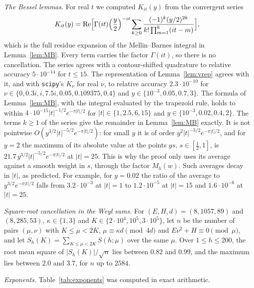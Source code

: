 \documentclass[11pt]{amsart}
\theoremstyle{remark}
\theoremstyle{definition}
\numberwithin{equation}{section}
\begin{document}
\emph{The Bessel lemmas.} For real $t$ we computed $K_{it}(y)$ from the convergent series
\[
K_{it}(y)=\operatorname{Re}\Bigl[\Gamma(it)\Bigl(\frac y2\Bigr)^{-it}\sum_{k\ge0}\frac{(-1)^k(y/2)^{2k}}{k!\prod_{m=1}^k(it-m)}\Bigr],
\]
which is the full residue expansion of the Mellin--Barnes integral in Lemma~\ref{lem:MB}. Every term carries the factor $\Gamma(it)$, so there is no cancellation. The series agrees with a contour-shifted quadrature to relative accuracy $5\cdot10^{-14}$ for $t\le15$. The representation of Lemma~\ref{lem:vrep} agrees with it, and with \texttt{scipy}'s $K_\nu$ for real $\nu$, to relative accuracy $2.3\cdot10^{-10}$ for $\nu\in\{0,0.3i,i,7.5i,0.05,0.109375,0.4\}$ and $y\in\{10^{-3},0.05,0.7,3\}$. The formula of Lemma~\ref{lem:MB}, with the integral evaluated by the trapezoid rule, holds to within $4\cdot10^{-15}|t|^{-1/2}e^{-\pi|t|/2}$ for $|t|\in\{1,2.5,6,15\}$ and $y\in\{10^{-3},0.02,0.4,2\}$. The terms $k\ge1$ of the series give the remainder in Lemma~\ref{lem:MB} exactly. It is not pointwise $O(y^{3/2}|t|^{-5/2}e^{-\pi|t|/2})$: for small $y$ it is of order $y^2|t|^{-3/2}e^{-\pi|t|/2}$, and for $y=2$ the maximum of its absolute value at the points $ys$, $s\in[\frac12,1]$, is $21.7\,y^{3/2}|t|^{-5/2}e^{-\pi|t|/2}$ at $|t|=25$. This is why the proof only uses its average against a smooth weight in $s$, through the factor $M_h(w)$. Such averages decay in $|t|$, as predicted. For example, for $y=0.02$ the ratio of the average to $y^{3/2}e^{-\pi|t|/2}$ falls from $3.2\cdot10^{-3}$ at $|t|=1$ to $1.2\cdot10^{-5}$ at $|t|=15$ and $1.6\cdot10^{-6}$ at $|t|=25$.

\emph{Square-root cancellation in the Weyl sums.} For $(E,H,d)=(8,1057,89)$ and $(8,285,53)$, $\kappa\in\{1,3\}$ and $K\in\{2\cdot10^4,10^5,3\cdot10^5\}$, let $n$ be the number of pairs $(\mu,\nu)$ with $K\le\mu<2K$, $\mu\equiv\kappa d\pmod{4d}$ and $E\nu^2+H\equiv0\pmod\mu$, and let $S_h(K)=\sum_{K\le\mu<2K}S(h;\mu)$ over the same $\mu$. Over $1\le h\le200$, the root mean square of $|S_h(K)|/\sqrt n$ lies between $0.82$ and $0.99$, and the maximum lies between $2.0$ and $3.7$, for $n$ up to $2584$.

\emph{Exponents.} Table~\ref{tab:exponents} was computed in exact arithmetic.
\end{document}
